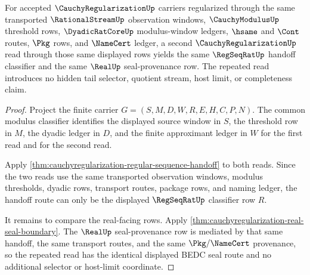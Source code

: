 \begin{theorem}
\label{thm:cauchyregularization-common-modulus-idempotence}
For accepted $\CauchyRegularizationUp$ carriers regularized through the same
transported $\RationalStreamUp$ observation windows, $\CauchyModulusUp$
threshold rows, $\DyadicRatCoreUp$ modulus-window ledgers, $\hsame$ and
$\Cont$ routes, $\Pkg$ rows, and $\NameCert$ ledger, a second
$\CauchyRegularizationUp$ read through those same displayed rows yields the
same $\RegSeqRatUp$ handoff classifier and the same $\RealUp$ seal-provenance
row. The repeated read introduces no hidden tail selector, quotient stream,
host limit, or completeness claim.
\end{theorem}
\begin{proof}
Project the finite carrier
$G=(S,M,D,W,R,E,H,C,P,N)$. The common modulus classifier identifies the
displayed source window in $S$, the threshold row in $M$, the dyadic ledger in
$D$, and the finite approximant ledger in $W$ for the first read and for the
second read.

Apply \autoref{thm:cauchyregularization-regular-sequence-handoff} to both
reads. Since the two reads use the same transported observation windows,
modulus thresholds, dyadic rows, transport routes, package rows, and naming
ledger, the handoff route can only be the displayed $\RegSeqRatUp$ classifier
row $R$.

It remains to compare the real-facing rows. Apply
\autoref{thm:cauchyregularization-real-seal-boundary}. The $\RealUp$
seal-provenance row is mediated by that same handoff, the same transport
routes, and the same $\Pkg/\NameCert$ provenance, so the repeated read has the
identical displayed BEDC seal route and no additional selector or host-limit
coordinate.
\end{proof}

